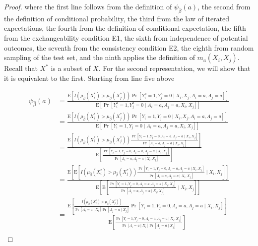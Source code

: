 \begin{proof}
where the first line follows from the definition of $\psi_{\widehat{\beta}}(a)$, the second from the definition of conditional probability, the third from the law of iterated expectations, the fourth from the definition of conditional expectation, the fifth from the exchangeability condition E1, the sixth from independence of potential outcomes, the seventh from the consistency condition E2, the eighth from random sampling of the test set, and the ninth applies the definition of $m_a(X_i, X_j)$. Recall that $X^*$ is a subset of $X$. For the second representation, we will show that it is equivalent to the first. Starting from line five above

$$
\begin{aligned}
\psi_{\widehat{\beta}}(a)&= \frac{\mathrm{E}\left[I\left(\mu_{\widehat{\beta}}(X_i^*)>\mu_{\widehat{\beta}}(X_j^*)\right) \operatorname{Pr}\left[Y^a_i=1, Y^a_j=0  \mid X_i, X_j, A_i = a, A_j = a\right]\right]}{\mathrm{E}\left[\operatorname{Pr}\left[Y^a_i=1, Y^a_j=0  \mid A_i = a, A_j = a, X_i, X_j\right]\right]} \\
&= \frac{\mathrm{E}\left[I\left(\mu_{\widehat{\beta}}(X_i^*)>\mu_{\widehat{\beta}}(X_j^*)\right) \operatorname{Pr}\left[Y_i=1, Y_j=0  \mid X_i, X_j, A_i = a, A_j = a\right]\right]}{\mathrm{E}\left[\operatorname{Pr}\left[Y_i=1, Y_j=0  \mid A_i = a, A_j = a, X_i, X_j\right]\right]} \\
&= \frac{\mathrm{E}\left[I\left(\mu_{\widehat{\beta}}(X_i^*)>\mu_{\widehat{\beta}}(X_j^*)\right) \frac{\operatorname{Pr}\left[Y_i=1, Y_j=0, A_i = a, A_j = a \mid X_i, X_j\right]}{\operatorname{Pr}\left[A_i = a, A_j = a \mid X_i, X_j\right]}\right]}{\mathrm{E}\left[\frac{\operatorname{Pr}\left[Y_i=1, Y_j=0, A_i = a, A_j = a \mid X_i, X_j\right]}{\operatorname{Pr}\left[A_i = a, A_j = a \mid X_i, X_j\right]}\right]} \\
&= \frac{\mathrm{E}\left[\mathrm{E}\left[I\left(\mu_{\widehat{\beta}}(X_i^*)>\mu_{\widehat{\beta}}(X_j^*)\right) \frac{\operatorname{Pr}\left[Y_i=1, Y_j=0, A_i = a, A_j = a \mid X_i, X_j\right]}{\operatorname{Pr}\left[A_i = a, A_j = a \mid X_i, X_j\right]} \mid X_i, X_j\right]\right]}{\mathrm{E}\left[\mathrm{E}\left[\frac{\operatorname{Pr}\left[Y_i=1, Y_j=0, A_i = a, A_j = a \mid X_i, X_j\right]}{\operatorname{Pr}\left[A_i=a, A_j = a \mid X_i, X_j\right]} \mid X_i, X_j\right]\right]} \\
&= \frac{\mathrm{E}\left[\frac{I\left(\mu_{\widehat{\beta}}(X_i^*)>\mu_{\widehat{\beta}}(X_j^*)\right)}{\operatorname{Pr}\left[A_i = a \mid X_i\right] \operatorname{Pr}\left[A_j = a \mid X_j\right]} \operatorname{Pr}\left[Y_i=1, Y_j=0, A_i = a, A_j = a \mid X_i, X_j\right]\right]}{\mathrm{E}\left[\frac{\operatorname{Pr}\left[Y_i=1, Y_j=0, A_i = a, A_j = a \mid X_i, X_j\right]}{\operatorname{Pr}[A_i = a \mid X_i] \Pr[A_j = a \mid X_j]}\right]} \\

\end{aligned}$$
\end{proof}
